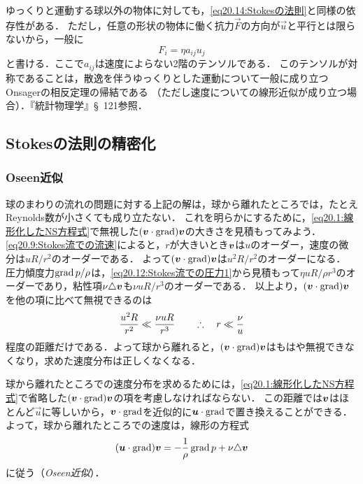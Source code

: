 ゆっくりと運動する球以外の物体に対しても，\eqref{eq20.14:Stokesの法則}と同様の依存性がある．
ただし，任意の形状の物体に働く抗力$\vec{F}$の方向が$\vec{u}$と平行とは限らないから，一般に
\begin{equation}
    F_i = \eta a_{ij} u_j
\end{equation}
と書ける．ここで$a_{ij}$は速度によらない2階のテンソルである．
このテンソルが対称であることは，散逸を伴うゆっくりとした運動について一般に成り立つOnsagerの相反定理の帰結である
（ただし速度についての線形近似が成り立つ場合）．『統計物理学』\S~121参照．







\subsection*{Stokesの法則の精密化}
\subsubsection*{Oseen近似}
球のまわりの流れの問題に対する上記の解は，球から離れたところでは，たとえReynolds数が小さくても成り立たない．
これを明らかにするために，\eqref{eq20.1:線形化したNS方程式}で無視した$(\vb*{v}\cdot\operatorname{grad})\vb*{v}$の大きさを見積もってみよう．
\eqref{eq20.9:Stokes流での流速}によると，$r$が大きいとき$\vb*{v}$は$u$のオーダー，速度の微分は$uR/r^2$のオーダーである．
よって$(\vb*{v}\cdot\operatorname{grad})\vb*{v}$は$u^2R/r^2$のオーダーになる．
圧力傾度力$\operatorname{grad} p / \rho$は，\eqref{eq20.12:Stokes流での圧力1}から見積もって$\eta uR/\rho r^3$のオーダーであり，粘性項$\nu \triangle\vb*{v}$も$\nu uR/r^3$のオーダーである．
以上より，$(\vb*{v}\cdot\operatorname{grad})\vb*{v}$を他の項に比べて無視できるのは
\begin{equation}
    \frac{u^2R}{r^2} \ll \frac{\nu uR}{r^3} \qquad\therefore\quad r \ll \frac{\nu}{u}
\end{equation}
程度の距離だけである．よって球から離れると，$(\vb*{v}\cdot\operatorname{grad})\vb*{v}$はもはや無視できなくなり，求めた速度分布は正しくなくなる．




球から離れたところでの速度分布を求めるためには，\eqref{eq20.1:線形化したNS方程式}で省略した$(\vb*{v}\cdot\operatorname{grad})\vb*{v}$の項を考慮しなければならない．
この距離では$\vb*{v}$はほとんど$\vec{u}$に等しいから，$\vb*{v}\cdot\operatorname{grad}$を近似的に$\vb*{u}\cdot\operatorname{grad}$で置き換えることができる．
よって，球から離れたところでの速度は，線形の方程式
\begin{equation}\label{eq20.17:Oseen近似した定常NS方程式}
    (\vb*{u}\cdot\operatorname{grad})\vb*{v} = -\frac{1}{\rho} \operatorname{grad} p + \nu \triangle\vb*{v}
\end{equation}
に従う（\emph{Oseen近似}）．


